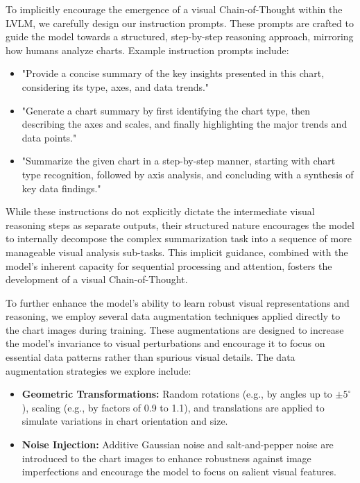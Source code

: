 To implicitly encourage the emergence of a visual Chain-of-Thought within the LVLM, we carefully design our instruction prompts.  These prompts are crafted to guide the model towards a structured, step-by-step reasoning approach, mirroring how humans analyze charts.  Example instruction prompts include:

\begin{itemize}
    \item "Provide a concise summary of the key insights presented in this chart, considering its type, axes, and data trends."
    \item "Generate a chart summary by first identifying the chart type, then describing the axes and scales, and finally highlighting the major trends and data points."
    \item "Summarize the given chart in a step-by-step manner, starting with chart type recognition, followed by axis analysis, and concluding with a synthesis of key data findings."
\end{itemize}
While these instructions do not explicitly dictate the intermediate visual reasoning steps as separate outputs, their structured nature encourages the model to internally decompose the complex summarization task into a sequence of more manageable visual analysis sub-tasks.  This implicit guidance, combined with the model's inherent capacity for sequential processing and attention, fosters the development of a visual Chain-of-Thought.

To further enhance the model's ability to learn robust visual representations and reasoning, we employ several data augmentation techniques applied directly to the chart images during training. These augmentations are designed to increase the model's invariance to visual perturbations and encourage it to focus on essential data patterns rather than spurious visual details.  The data augmentation strategies we explore include:

\begin{itemize}
    \item \textbf{Geometric Transformations:}  Random rotations (e.g., by angles up to $\pm 5^\circ$), scaling (e.g., by factors of 0.9 to 1.1), and translations are applied to simulate variations in chart orientation and size.
    \item \textbf{Noise Injection:}  Additive Gaussian noise and salt-and-pepper noise are introduced to the chart images to enhance robustness against image imperfections and encourage the model to focus on salient visual features.
\end{itemize}

